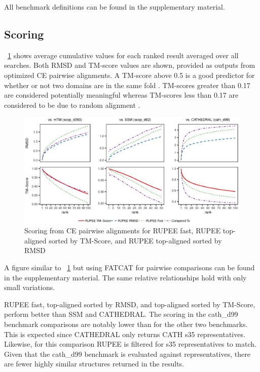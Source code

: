 \documentclass[letter,center,fleqn]{NAR}
\begin{document}
All benchmark definitions can be found in the supplementary material. 

\subsection{Scoring}

\figurename~\ref{fig:combined_scoring_ce} shows average cumulative values for each ranked result averaged over all searches.
Both RMSD and TM-score values are shown, provided as outputs from optimized CE pairwise alignments. 
A TM-score above 0.5 is a good predictor for whether or not two domains are in the same fold \cite{Xu2010}.
TM-scores greater than 0.17 are considered potentially meaningful whereas TM-scores less than 0.17 are considered to be due to random alignment \cite{Zhang2004}.

\begin{figure}[tb]
\begin{center}
\includegraphics{combined_scoring_ce}
\end{center}
\caption{Scoring from CE pairwise alignments for RUPEE fast, RUPEE top-aligned sorted by TM-Score, and RUPEE top-aligned sorted by RMSD}
\label{fig:combined_scoring_ce}
\end{figure}

A figure similar to \figurename~\ref{fig:combined_scoring_ce} but using FATCAT for pairwise comparisons can be found in the supplementary material. 
The same relative relationships hold with only small variations. 

RUPEE fast, top-aligned sorted by RMSD, and top-aligned sorted by TM-Score, perform better than SSM and CATHEDRAL.
The scoring in the cath\_d99 benchmark comparisons are notably lower than for the other two benchmarks. 
This is expected since CATHEDRAL only returns CATH s35 representatives.
Likewise, for this comparison RUPEE is filtered for s35 representatives to match. 
Given that the cath\_d99 benchmark is evaluated against representatives, there are fewer highly similar structures returned in the results. 
\end{document}
